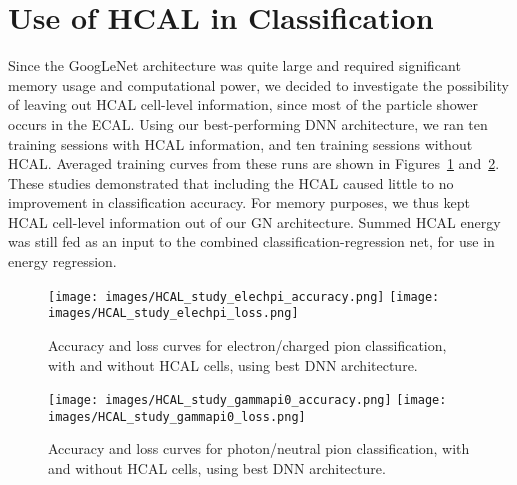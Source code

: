 \section{Use of HCAL in Classification}\label{app:classification_HCAL}

Since the GoogLeNet architecture was quite large and required significant memory usage and computational power, we decided to investigate the possibility of leaving out HCAL cell-level information, since most of the particle shower occurs in the ECAL. Using our best-performing DNN architecture, we ran ten training sessions with HCAL information, and ten training sessions without HCAL. Averaged training curves from these runs are shown in Figures~\ref{fig:HCAL_study_elechpi} and~\ref{fig:HCAL_study_gammapi0}. These studies demonstrated that including the HCAL caused little to no improvement in classification accuracy. For memory purposes, we thus kept HCAL cell-level information out of our GN architecture. Summed HCAL energy was still fed as an input to the combined classification-regression net, for use in energy regression.

\begin{figure}[htbp]
\centering
\texttt{[image: images/HCAL\_study\_elechpi\_accuracy.png]}
\texttt{[image: images/HCAL\_study\_elechpi\_loss.png]}
\caption{Accuracy and loss curves for electron/charged pion classification, with and without HCAL cells, using best DNN architecture.}
\label{fig:HCAL_study_elechpi}
\end{figure}

\begin{figure}[htbp]
\centering
\texttt{[image: images/HCAL\_study\_gammapi0\_accuracy.png]}
\texttt{[image: images/HCAL\_study\_gammapi0\_loss.png]}
\caption{Accuracy and loss curves for photon/neutral pion classification, with and without HCAL cells, using best DNN architecture.}
\label{fig:HCAL_study_gammapi0}
\end{figure}
